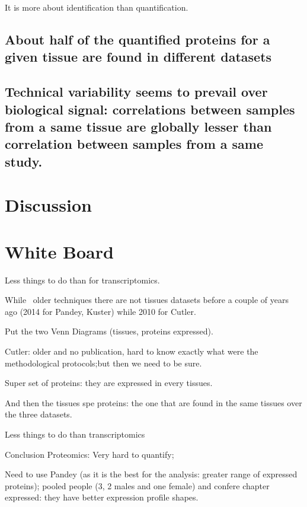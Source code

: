 It is more about identification than quantification.

\subsection{About half of the quantified proteins for a given tissue are found
in different datasets}

\subsection{Technical variability seems to prevail over biological signal:
correlations between samples from a same tissue are globally lesser than
correlation between samples from a same study.}


\section{Discussion}





\section{White Board}

Less things to do than for transcriptomics.

While \ms\ older techniques there are not tissues datasets before a couple of
years ago (2014 for Pandey, Kuster) while 2010 for Cutler.


Put the two Venn Diagrams (tissues, proteins expressed).

Cutler: older and no publication,
hard to know exactly what were the methodological protocols;but then we need to
be sure.

Super set of proteins: they are expressed in every tissues.

And then the tissues spe proteins: the one that are found in the same tissues
over the three datasets.


Less things to do than transcriptomics

Conclusion Proteomics: Very hard to quantify;

Need to use Pandey (as it is the best for the analysis:
greater range of expressed proteins); pooled people (3, 2 males and one female)
and confere chapter expressed: they have better expression profile shapes.




